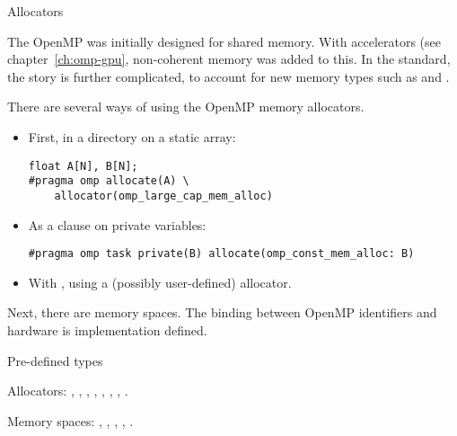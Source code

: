  {Allocators}

The OpenMP was initially designed for shared memory.
With accelerators (see chapter~\ref{ch:omp-gpu}, non-coherent memory was added to this.
In the  standard, the story is further complicated, to account
for new memory types such as 
and .

There are several ways of using the OpenMP memory allocators.
\begin{itemize}
\item
  First, in a directory on a static array:
\begin{lstlisting}
float A[N], B[N];
#pragma omp allocate(A) \
    allocator(omp_large_cap_mem_alloc)
\end{lstlisting}
\item As a clause on private variables:
\begin{lstlisting}
#pragma omp task private(B) allocate(omp_const_mem_alloc: B)
\end{lstlisting}
\item
  With , using a (possibly user-defined) allocator.
\end{itemize}

Next, there are memory spaces. The binding between OpenMP identifiers and hardware
is implementation defined.

 {Pre-defined types}

Allocators:
,
,
,
,
,
,
,
.

Memory spaces:
,
,
,
,
.
